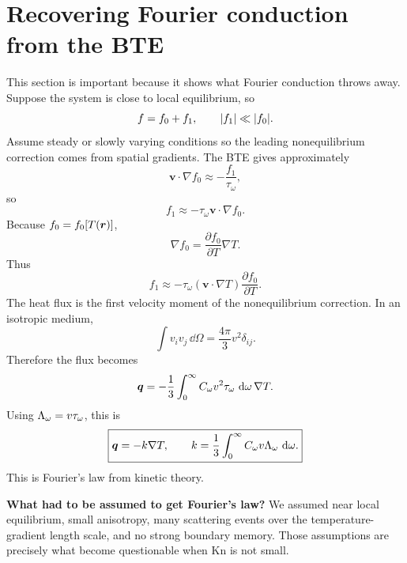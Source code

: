 \documentclass[11pt]{article}
\begin{document}
\section{Recovering Fourier conduction from the BTE}
This section is important because it shows what Fourier conduction throws away. Suppose the system is close to local equilibrium, so
\begin{equation}
    f=f_0+f_1,
    \qquad
    \abs{f_1}\ll\abs{f_0}.
\end{equation}
Assume steady or slowly varying conditions so the leading nonequilibrium correction comes from spatial gradients. The BTE gives approximately
\begin{equation}
    \bm{v}\cdot\nabla f_0\approx -\frac{f_1}{\tau_\omega},
\end{equation}
so
\begin{equation}
    f_1\approx -\tau_\omega\bm{v}\cdot\nabla f_0.
    \label{eq:f1_fourier}
\end{equation}
Because \(f_0=f_0[T(\bm{r})]\),
\begin{equation}
    \nabla f_0=\frac{\partial f_0}{\partial T}\nabla T.
\end{equation}
Thus
\begin{equation}
    f_1\approx -\tau_\omega(\bm{v}\cdot\nabla T)\frac{\partial f_0}{\partial T}.
\end{equation}
The heat flux is the first velocity moment of the nonequilibrium correction. In an isotropic medium,
\begin{equation}
    \int v_i v_j\,\dd\Omega = \frac{4\pi}{3}v^2\delta_{ij}.
\end{equation}
Therefore the flux becomes
\begin{equation}
    \bm{q}=-\frac{1}{3}\int_0^\infty C_\omega v^2\tau_\omega\,\mathop{}\!\mathrm{d}\omega\,\nabla T.
\end{equation}
Using \(\Lambda_\omega=v\tau_\omega\), this is
\begin{equation}
    \boxed{\bm{q}=-k\nabla T,\qquad
    k=\frac{1}{3}\int_0^\infty C_\omega v\Lambda_\omega\,\mathop{}\!\mathrm{d}\omega.}
    \label{eq:kinetic_k}
\end{equation}
This is Fourier's law from kinetic theory.

\begin{physicsbox}
\textbf{What had to be assumed to get Fourier's law?} We assumed near local equilibrium, small anisotropy, many scattering events over the temperature-gradient length scale, and no strong boundary memory. Those assumptions are precisely what become questionable when \(\mathrm{Kn}\) is not small.
\end{physicsbox}
\end{document}
